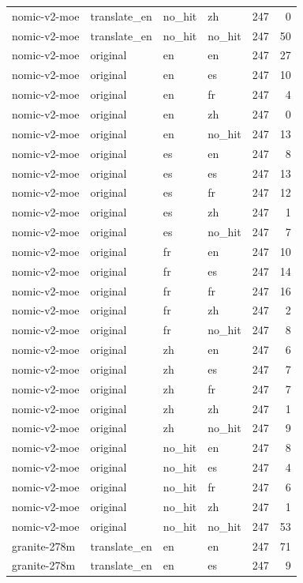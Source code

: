 \begin{tabular}{llllrr}
nomic-v2-moe & translate\_en & no\_hit & zh & 247 & 0 \\
nomic-v2-moe & translate\_en & no\_hit & no\_hit & 247 & 50 \\
nomic-v2-moe & original & en & en & 247 & 27 \\
nomic-v2-moe & original & en & es & 247 & 10 \\
nomic-v2-moe & original & en & fr & 247 & 4 \\
nomic-v2-moe & original & en & zh & 247 & 0 \\
nomic-v2-moe & original & en & no\_hit & 247 & 13 \\
nomic-v2-moe & original & es & en & 247 & 8 \\
nomic-v2-moe & original & es & es & 247 & 13 \\
nomic-v2-moe & original & es & fr & 247 & 12 \\
nomic-v2-moe & original & es & zh & 247 & 1 \\
nomic-v2-moe & original & es & no\_hit & 247 & 7 \\
nomic-v2-moe & original & fr & en & 247 & 10 \\
nomic-v2-moe & original & fr & es & 247 & 14 \\
nomic-v2-moe & original & fr & fr & 247 & 16 \\
nomic-v2-moe & original & fr & zh & 247 & 2 \\
nomic-v2-moe & original & fr & no\_hit & 247 & 8 \\
nomic-v2-moe & original & zh & en & 247 & 6 \\
nomic-v2-moe & original & zh & es & 247 & 7 \\
nomic-v2-moe & original & zh & fr & 247 & 7 \\
nomic-v2-moe & original & zh & zh & 247 & 1 \\
nomic-v2-moe & original & zh & no\_hit & 247 & 9 \\
nomic-v2-moe & original & no\_hit & en & 247 & 8 \\
nomic-v2-moe & original & no\_hit & es & 247 & 4 \\
nomic-v2-moe & original & no\_hit & fr & 247 & 6 \\
nomic-v2-moe & original & no\_hit & zh & 247 & 1 \\
nomic-v2-moe & original & no\_hit & no\_hit & 247 & 53 \\
granite-278m & translate\_en & en & en & 247 & 71 \\
granite-278m & translate\_en & en & es & 247 & 9 \\

\end{tabular}
